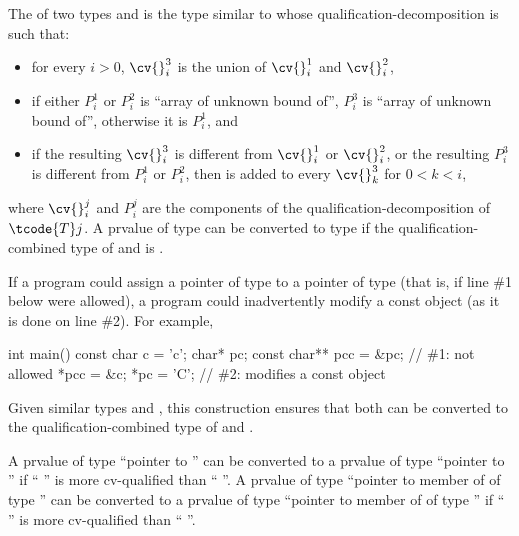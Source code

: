 \pnum
The  of two types  and 
is the type 
similar to  whose qualification-decomposition is such that:
\begin{itemize}
\item
for every $i > 0$, $\cv{}^3_i$ is the union of
$\cv{}^1_i$ and $\cv{}^2_i$,
\item
if either $P^1_i$ or $P^2_i$ is ``array of unknown bound of'',
$P^3_i$ is ``array of unknown bound of'', otherwise it is $P^1_i$, and
\item
if the resulting $\cv{}^3_i$ is different from $\cv{}^1_i$ or $\cv{}^2_i$,
or the resulting $P^3_i$ is different from $P^1_i$ or $P^2_i$,
then  is added to every $\cv{}^3_k$ for $0 < k < i$,
\end{itemize}
where $\cv{}^j_i$ and $P^j_i$ are the components of
the qualification-decomposition of $\tcode{T}j$.
A prvalue of type 
can be converted to type 
if the qualification-combined type of  and  is .
\begin{note}
If a program could assign a pointer of type  to a pointer of
type   (that is, if line \#1 below were
allowed), a program could inadvertently modify a const object
(as it is done on line \#2). For example,
\begin{codeblock}
int main() {
const char c = 'c';
char* pc;
const char** pcc = &pc;       // \#1: not allowed
*pcc = &c;
*pc = 'C';                    // \#2: modifies a const object
}
\end{codeblock}
\end{note}
\begin{note}
Given similar types  and , this
construction ensures that
both can be converted to the qualification-combined type of  and .
\end{note}

\pnum
\begin{note}
A prvalue of type ``pointer to  '' can be
converted to a prvalue of type ``pointer to  '' if
`` '' is more cv-qualified than ``
''.
A prvalue of type ``pointer to member of  of type 
'' can be converted to a prvalue of type ``pointer to member
of  of type  '' if ``
'' is more cv-qualified than `` ''.
\end{note}

